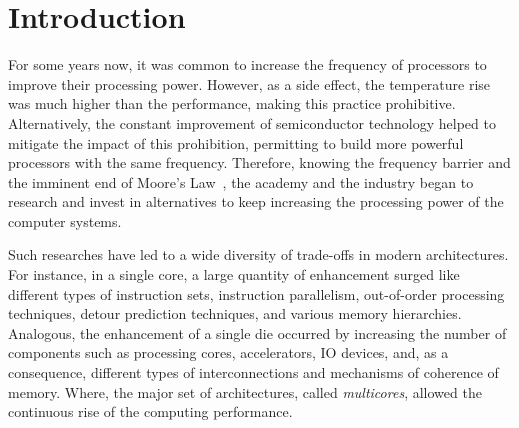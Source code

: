\chapter{Introduction}
\label{ch.intro}

    For some years now, it was common to increase the frequency of processors to improve their processing power.
    However, as a side effect, the temperature rise was much higher than the performance, making this practice prohibitive.
    Alternatively, the constant improvement of semiconductor technology helped to mitigate the impact of this prohibition, permitting to build more powerful processors with the same frequency.
    Therefore, knowing the frequency barrier and the imminent end of Moore's Law~\cite{moore:1965}, the academy and the industry began to research and invest in alternatives to keep increasing the processing power of the computer systems.

    Such researches have led to a wide diversity of trade-offs in modern architectures.
    For instance, in a single core, a large quantity of enhancement surged like different types of instruction sets, instruction parallelism, out-of-order processing techniques, detour prediction techniques, and various memory hierarchies.
    Analogous, the enhancement of a single die occurred by increasing the number of components such as processing cores, accelerators, IO devices, and, as a consequence, different types of interconnections and mechanisms of coherence of memory.
    Where, the major set of architectures, called \textit{multicores}, allowed the continuous rise of the computing performance.

